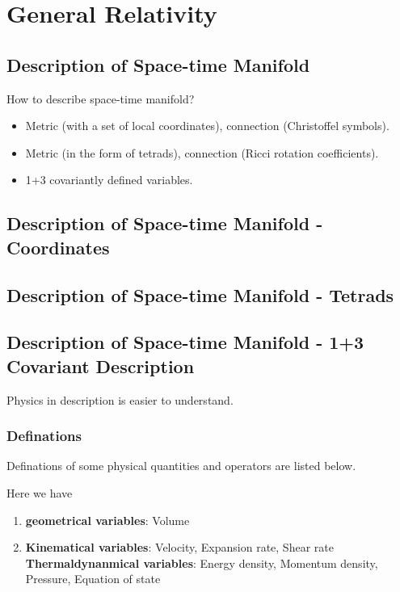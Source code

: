 \documentclass[12pt,a4paper]{book}
\begin{document}
\chapter{General Relativity}






\section{Description of Space-time Manifold}


How to describe space-time manifold?
\begin{itemize}
\item
Metric (with a set of local coordinates), connection (Christoffel symbols).
\item
Metric (in the form of tetrads), connection (Ricci rotation coefficients).
\item
1+3 covariantly defined variables.
\end{itemize}



\section{Description of Space-time Manifold - Coordinates}

\section{Description of Space-time Manifold - Tetrads}




\section{Description of Space-time Manifold - 1+3 Covariant Description}

Physics in description is easier to understand.

\subsection{Definations}

Definations of some physical quantities and operators are listed below.

Here we have
\begin{enumerate}
	\item 
{\bf geometrical variables}: Volume
\item
{\bf Kinematical variables}: Velocity, Expansion rate, Shear rate
{\bf Thermaldynanmical variables}: Energy density, Momentum density, Pressure, Equation of state
\end{enumerate}
\end{document}
